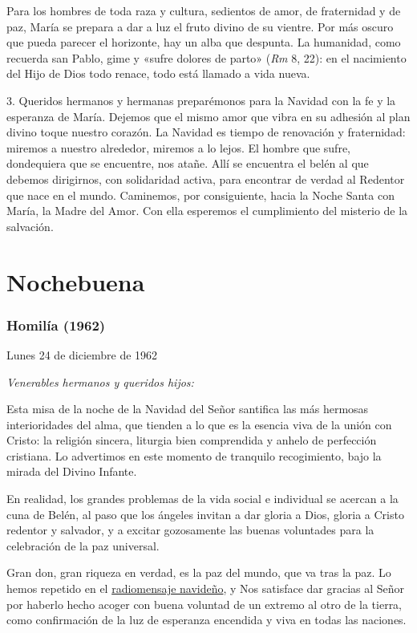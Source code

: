 Para los hombres de toda raza y cultura, sedientos de amor, de
fraternidad y de paz, María se prepara a dar a luz el fruto divino de su
vientre. Por más oscuro que pueda parecer el horizonte, hay un alba que
despunta. La humanidad, como recuerda san Pablo, gime y «sufre dolores
de parto» (\emph{Rm} 8, 22): en el nacimiento del Hijo de Dios todo
renace, todo está llamado a vida nueva.

3. Queridos hermanos y hermanas preparémonos para la Navidad con la fe y
la esperanza de María. Dejemos que el mismo amor que vibra en su
adhesión al plan divino toque nuestro corazón. La Navidad es tiempo de
renovación y fraternidad: miremos a nuestro alrededor, miremos a lo
lejos. El hombre que sufre, dondequiera que se encuentre, nos atañe.
Allí se encuentra el belén al que debemos dirigirnos, con solidaridad
activa, para encontrar de verdad al Redentor que nace en el mundo.
Caminemos, por consiguiente, hacia la Noche Santa con María, la Madre
del Amor. Con ella esperemos el cumplimiento del misterio de la
salvación.


\section{Nochebuena}
\subsubsection{Homilía (1962)}

Lunes 24 de diciembre de 1962
 
\emph{Venerables hermanos y queridos hijos:}

Esta misa de la noche de la Navidad del Señor santifica las más hermosas
interioridades del alma, que tienden a lo que es la esencia viva de la
unión con Cristo: la religión sincera, liturgia bien comprendida y
anhelo de perfección cristiana. Lo advertimos en este momento de
tranquilo recogimiento, bajo la mirada del Divino Infante.

En realidad, los grandes problemas de la vida social e individual se
acercan a la cuna de Belén, al paso que los ángeles invitan a dar gloria
a Dios, gloria a Cristo redentor y salvador, y a excitar gozosamente las
buenas voluntades para la celebración de la paz universal.

Gran don, gran riqueza en verdad, es la paz del mundo, que va tras la
paz. Lo hemos repetido en el
\href{/content/john-xxiii/es/messages/pont_messages/1962/documents/hf_j-xxiii_mes_19621222_natale.html}{radiomensaje
	navideño}, y Nos satisface dar gracias al Señor por haberlo hecho acoger
con buena voluntad de un extremo al otro de la tierra, como confirmación
de la luz de esperanza encendida y viva en todas las naciones.

